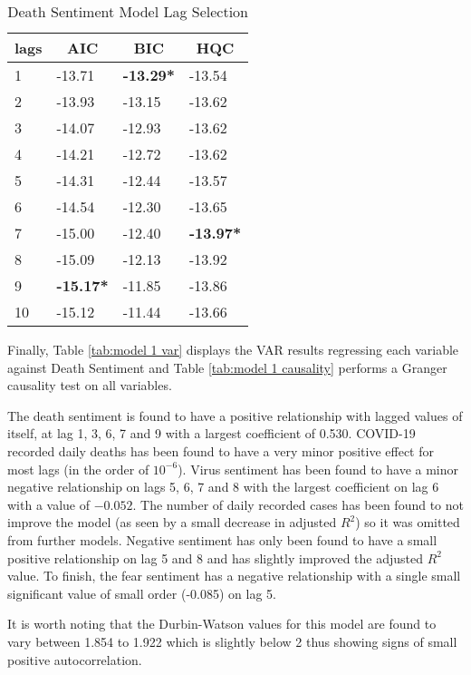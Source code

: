 \begin{table}[H]
\centering
\begin{tabular}{@{}llll@{}}
\toprule
\multicolumn{1}{c}{\textbf{lags}} & \multicolumn{1}{c}{\textbf{AIC}} & \multicolumn{1}{c}{\textbf{BIC}} & \multicolumn{1}{c}{\textbf{HQC}} \\ \midrule
1 & -13.71 & \textbf{-13.29*} & -13.54 \\
2 & -13.93 & -13.15 & -13.62 \\
3 & -14.07 & -12.93 & -13.62 \\
4 & -14.21 & -12.72 & -13.62 \\
5 & -14.31 & -12.44 & -13.57 \\
6 & -14.54 & -12.30 & -13.65 \\
7 & -15.00 & -12.40 & \textbf{-13.97*} \\
8 & -15.09 & -12.13 & -13.92 \\
9 & \textbf{-15.17*} & -11.85 & -13.86 \\
10 & -15.12 & -11.44 & -13.66 \\ \bottomrule
\end{tabular}
\caption{Death Sentiment Model Lag Selection}
\label{tab:model 1 lag}
\end{table}

Finally, Table \ref{tab:model 1 var} displays the VAR results regressing each variable against Death Sentiment and Table \ref{tab:model 1 causality} performs a Granger causality test on all variables.

The death sentiment is found to have a positive relationship with lagged values of itself, at lag 1, 3, 6, 7 and 9 with a largest coefficient of 0.530. COVID-19 recorded daily deaths has been found to have a very minor positive effect for most lags (in the order of $10^{-6}$). Virus sentiment has been found to have a minor negative relationship on lags 5, 6, 7 and 8 with the largest coefficient on lag 6 with a value of $-0.052$. The number of daily recorded cases has been found to not improve the model (as seen by a small decrease in adjusted $R^{2}$) so it was omitted from further models. Negative sentiment has only been found to have a small positive relationship on lag 5 and 8 and has slightly improved the adjusted $R^2$ value. To finish, the fear sentiment has a negative relationship with a single small significant value of small order (-0.085) on lag 5.

It is worth noting that the Durbin-Watson values for this model are found to vary between 1.854 to 1.922 which is slightly below 2 thus showing signs of small positive autocorrelation. 

